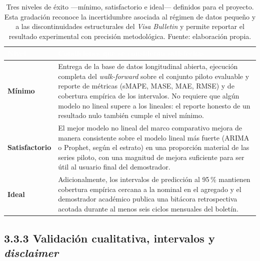 \documentclass[12pt,letterpaper]{report}
\begin{document}
\begin{table}[H]
    \centering
    \footnotesize
    \setlength{\arrayrulewidth}{0.7pt}
    \setlength{\tabcolsep}{4pt}
    \begin{tabular}{>{\raggedright\arraybackslash}p{2.6cm}
                    >{\raggedright\arraybackslash}p{9.4cm}}
        \hline
        \rowcolor{uacjblue!85}
        \textcolor{white}{\textbf{Nivel}} &
        \textcolor{white}{\textbf{Condiciones que se consideran satisfechas}} \\
        \hline
        \rowcolor{uacjblue!4}
        \textbf{Mínimo} & Entrega de la base de datos longitudinal abierta, ejecución completa del \textit{walk-forward} sobre el conjunto piloto evaluable y reporte de métricas (sMAPE, MASE, MAE, RMSE) y de cobertura empírica de los intervalos. No requiere que algún modelo no lineal supere a los lineales: el reporte honesto de un resultado nulo también cumple el nivel mínimo. \\
        \textbf{Satisfactorio} & El mejor modelo no lineal del marco comparativo mejora de manera consistente sobre el modelo lineal más fuerte (ARIMA o Prophet, según el estrato) en una proporción material de las series piloto, con una magnitud de mejora suficiente para ser útil al usuario final del demostrador. \\
        \rowcolor{uacjblue!4}
        \textbf{Ideal} & Adicionalmente, los intervalos de predicción al 95\,\% mantienen cobertura empírica cercana a la nominal en el agregado y el demostrador académico publica una bitácora retrospectiva acotada durante al menos seis ciclos mensuales del boletín. \\
        \hline
    \end{tabular}
    \caption[Niveles de éxito del proyecto.]{Tres niveles de éxito ---mínimo, satisfactorio e ideal--- definidos para el proyecto. Esta gradación reconoce la incertidumbre asociada al régimen de datos pequeño y a las discontinuidades estructurales del \textit{Visa Bulletin} y permite reportar el resultado experimental con precisión metodológica. Fuente: elaboración propia.}
    \label{tab:niveles_exito_visapredict}
\end{table}

\subsection*{3.3.3 Validación cualitativa, intervalos y \textit{disclaimer}}
\end{document}
